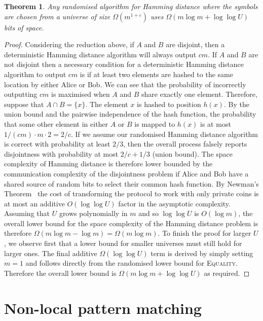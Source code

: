 \documentclass{article}
\renewcommand{\epsilon}{\varepsilon}
\newcommand{\equality}{\textsc{Equality}\xspace}
\theoremstyle{plain}
\newtheorem{theorem}{Theorem}[]
\theoremstyle{definition}
\begin{document}
\begin{theorem}
    Any randomised algorithm for Hamming distance where the symbols are chosen from a universe of size $\Omega(m^{1+\epsilon})$ uses $\Omega(m\log{m} + \log{\log{U}})$ bits of space.
\end{theorem}
\begin{proof}
    Considering the reduction above, if $A$ and $B$ are disjoint, then a deterministic Hamming distance algorithm will always output $cm$. If $A$ and $B$ are not disjoint then a necessary condition for a deterministic Hamming distance algorithm to output $cm$ is if at least two elements are hashed to the same location by either Alice or Bob. We can see that the probability of incorrectly outputting $cm$ is maximised when $A$ and $B$ share exactly one element. Therefore, suppose that $A\cap B=\{x\}$. The element $x$ is hashed to position $h(x)$. By the union bound and the pairwise independence of the hash function, the probability that some other element in either $A$ or $B$ is mapped to $h(x)$ is at most $1/(cm)\cdot m\cdot 2=2/c$. If we assume our randomised Hamming distance algorithm is correct with probability at least $2/3$, then the overall process falsely reports disjointness with probability at most $2/c + 1/3$ (union bound).  The space complexity of Hamming distance is therefore lower bounded by the communication complexity of the disjointness problem if Alice and Bob have a shared source of random bits to select their common hash function. By Newman's Theorem~\cite{Newman:1991} the cost of transforming the protocol to work with only private coins is at most an additive $O(\log{\log{U}})$ factor in the asymptotic complexity. Assuming that $U$ grows polynomially in $m$ and so $\log{\log{U}}$ is $O(\log{m})$, the overall lower bound for the space complexity of the Hamming distance problem is therefore $\Omega(m\log{m} - \log{m}) = \Omega(m\log{m})$.  To finish the proof for larger $U$, we observe first that a lower bound for smaller universes must still hold for larger ones. The final additive $\Omega(\log \log{U})$ term is derived by simply setting $m=1$ and follows directly from the randomised lower bound for \equality. Therefore the overall lower bound is $\Omega(m\log{m} + \log{\log{U}})$ as required.
\end{proof}


\section{Non-local pattern matching} \label{sec:non-local}
\end{document}
